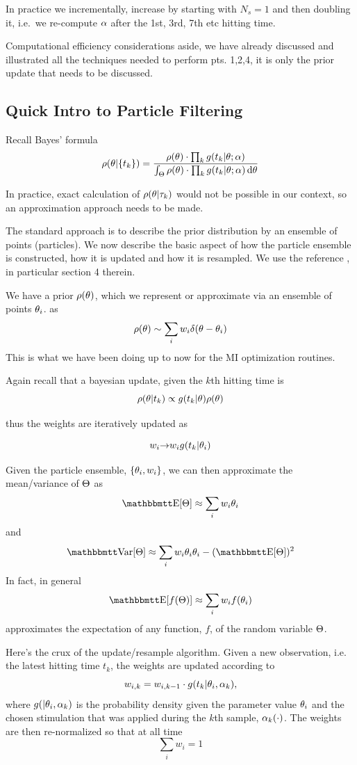 \documentclass{article}
\begin{document}
In practice we incrementally, increase by starting with $N_s=1$ and then
doubling it, i.e.\ we re-compute ${\alpha}$ after the 1st, 3rd, 7th etc hitting time.

Computational efficiency considerations aside, we have already discussed and
illustrated all the techniques needed to perform pts. 1,2,4, it is
only the prior update that needs to be discussed.

\subsection{Quick Intro to Particle Filtering}
Recall Bayes' formula
$$
\rho({\theta}| \{t_k\} ) = 
\frac{  \rho({\theta}) \cdot \prod_k g(t_k|{\theta} ; {\alpha}) }
	 { \int_{\Theta}  \rho({\theta}) \cdot \prod_k g(t_k|{\theta} ; {\alpha})  \, \mathrm{d} {\theta}}
$$

In practice, exact calculation of $\rho({\theta}|{\tau}_k)$ would not be possible in our
context, so an approximation approach needs to be made.

The standard approach is to describe the prior distribution by an ensemble of
points (particles). We now describe the basic aspect of how the particle
ensemble is constructed, how it is updated and how it is resampled. We use the
reference \cite{Granade2012}, in particular section 4 therein.

We have a prior
$ \rho({\theta})$, which we represent or approximate  via an ensemble of points ${\theta}_i$. as 
$$ \rho({\theta}) \sim \sum_i w_i \delta({\theta}-{\theta}_i)$$
This is what we have been doing up to now for the MI optimization routines.

Again recall that a bayesian update, given the $k$th hitting time is
$$ \rho({\theta}|t_k) \propto g(t_k|{\theta})\rho({\theta})$$

thus the weights are iteratively updated as 

$$w_i {\rightarrow} w_i g(t_k|{\theta}_i)$$

Given the particle ensemble, $\{{\theta}_i, w_i\}$, we can  then approximate the
mean/variance of ${\Theta}$ as
$$ \Exp[\Th] \approx \sum_i w_i \th_i$$
and 
$$ \Var[\Th] \approx \sum_i w_i \th_i \th_i - (\Exp[\Th])^2$$
In fact, in general 
$$\Exp[f(\Th)]\approx\sum_i w_i f(\th_i)$$ approximates the expectation of any
function, $f$, of the random variable ${\Theta}$.

Here's the crux of the update/resample algorithm. Given a new observation, i.e.
the latest hitting time $t_k$, the weights are updated according to
$$ w_{i,k} = w_{i,k-1}\cdot g(t_k| {\theta}_i, {\alpha}_k),$$where $g(|{\theta}_i, {\alpha}_k)$ is
the probability density given the parameter value ${\theta}_i$ and the chosen
stimulation that was applied during the $k$th sample, ${\alpha}_k(\cdot)$.
The weights are then re-normalized so that at all time $$\sum_i w_i = 1$$ 
\end{document}
